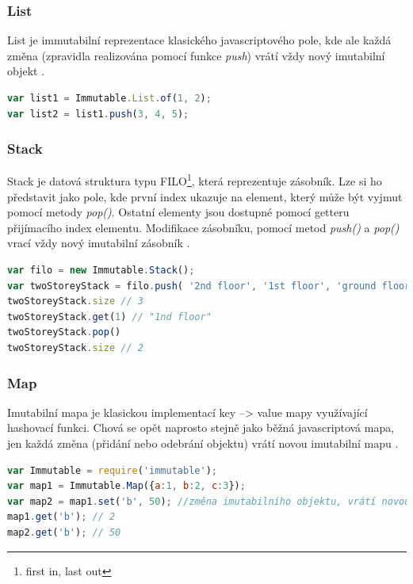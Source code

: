 \subsubsection{List}
List je immutabilní reprezentace klasického javascriptového pole, kde ale každá změna (zpravidla realizována pomocí funkce \textit{push}) vrátí vždy nový imutabilní objekt \cite{immutablejs} \cite{immutablejs_learn}.
\begin{lstlisting}[language=Javascript,caption={Ukázka práce s imutabilním objektem List v immutable.js \cite{immutablejs}}]
var list1 = Immutable.List.of(1, 2);
var list2 = list1.push(3, 4, 5);
\end{lstlisting}

\subsubsection{Stack}
Stack je datová struktura typu FILO\footnote{first in, last out}, která reprezentuje zásobník. Lze si ho představit jako pole, kde první index ukazuje na element, který může být vyjmut pomocí metody \textit{pop()}. Ostatní elementy jsou dostupné pomocí getteru přijímacího index elementu. Modifikace zásobníku, pomocí metod \textit{push()} a \textit{pop()} vrací vždy nový imutabilní zásobník \cite{immutablejs} \cite{immutablejs_learn}.
\begin{lstlisting}[language=Javascript,caption={Ukázka práce s imutabilním objektem Stack v immutable.js \cite{immutablejs}}]
var filo = new Immutable.Stack();
var twoStoreyStack = filo.push( '2nd floor', '1st floor', 'ground floor' );
twoStoreyStack.size // 3
twoStoreyStack.get(1) // "1nd floor"
twoStoreyStack.pop()
twoStoreyStack.size // 2
\end{lstlisting}

\subsubsection{Map}
Imutabilní mapa je klasickou implementací key –> value mapy využívající hashovací funkci. Chová se opět naprosto stejně jako běžná javascriptová mapa, jen každá změna (přidání nebo odebrání objektu) vrátí novou imutabilní mapu \cite{immutablejs} \cite{immutablejs_learn}.
\begin{lstlisting}[language=Javascript,caption={Ukázka práce s imutabilními mapami v immutable.js \cite{immutablejs}.}]
var Immutable = require('immutable');
var map1 = Immutable.Map({a:1, b:2, c:3});
var map2 = map1.set('b', 50); //změna imutabilního objektu, vrátí novou instanci
map1.get('b'); // 2
map2.get('b'); // 50
\end{lstlisting}


